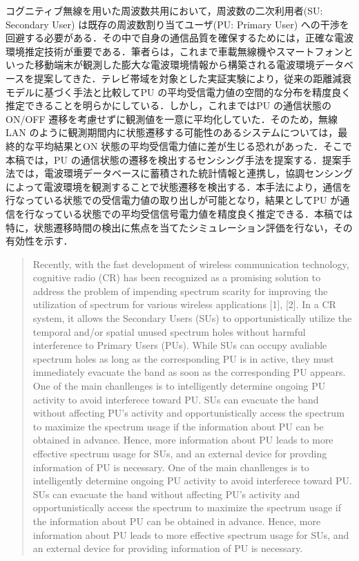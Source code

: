 {}
\begin{jabstract}
  コグニティブ無線を用いた周波数共用において，周波数の二次利用者(SU: Secondary User) は既存の周波数割り当てユーザ(PU: Primary User) への干渉を回避する必要がある．その中で自身の通信品質を確保するためには，正確な電波環境推定技術が重要である．筆者らは，これまで車載無線機やスマートフォンといった移動端末が観測した膨大な電波環境情報から構築される電波環境データベースを提案してきた．テレビ帯域を対象とした実証実験により，従来の距離減衰モデルに基づく手法と比較してPU の平均受信電力値の空間的な分布を精度良く推定できることを明らかにしている．しかし，これまではPU の通信状態のON/OFF 遷移を考慮せずに観測値を一意に平均化していた．そのため，無線LAN のように観測期間内に状態遷移する可能性のあるシステムについては，最終的な平均結果とON 状態の平均受信電力値に差が生じる恐れがあった．そこで本稿では，PU の通信状態の遷移を検出するセンシング手法を提案する．提案手法では，電波環境データベースに蓄積された統計情報と連携し，協調センシングによって電波環境を観測することで状態遷移を検出する．本手法により，通信を行なっている状態での受信電力値の取り出しが可能となり，結果としてPU が通信を行なっている状態での平均受信信号電力値を精度良く推定できる．本稿では特に，状態遷移時間の検出に焦点を当てたシミュレーション評価を行ない，その有効性を示す．
\end{jabstract}
%
%
%
\begin{abstract}
Recently, with the fast development of wireless communication technology, cognitive radio (CR) has been recognized as a promising solution to address the problem of impending spectrum scarity for improving the utilization of spectrum for various wireless applications [1], [2]. In a CR system, it allows the Secondary Users (SUs) to opportunistically utilize the temporal and/or spatial unused spectrum holes without harmful interference to Primary Users (PUs). While SUs can occupy avaliable spectrum holes as long as the corresponding PU is in active, they must immediately evacuate the band as soon as the corresponding PU appears. One of the main chanllenges is to intelligently determine ongoing PU activity to avoid interferece toward PU. SUs can evacuate the band without affecting PU’s activity and opportunistically access the spectrum to maximize the spectrum usage if the information about PU can be obtained in advance. Hence, more information about PU leads to more effective spectrum usage for SUs, and an external device for provding information of PU is necessary. One of the main chanllenges is to intelligently determine ongoing PU activity to avoid interferece toward PU. SUs can evacuate the band without affecting PU’s activity and opportunistically access the spectrum to maximize the spectrum usage if the information about PU can be obtained in advance. Hence, more information about PU leads to more effective spectrum usage for SUs, and an external device for providing information of PU is necessary.
\end{abstract}
